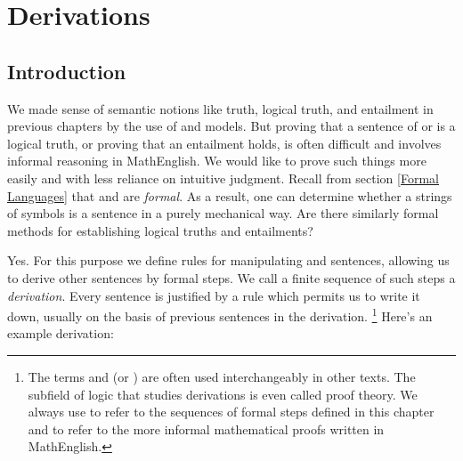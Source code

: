 
\chapter{Derivations}\label{Derivations}

\section{Introduction}\label{Derivation Preliminaries}


We made sense of semantic notions like truth, logical truth, and entailment in previous chapters by the use of \GSL{} and \GQL{} models.
But proving that a sentence of \GSL{} or \GQL{} is a logical truth, or proving that an entailment holds, is often difficult and involves informal reasoning in MathEnglish. 
We would like to prove such things more easily and with less reliance on intuitive judgment. 
Recall from section \ref{Formal Languages} that \GSL{} and \GQL{} are \emph{formal}.
As a result, one can determine whether a strings of symbols is a sentence in a purely mechanical way.
Are there similarly formal methods for establishing logical truths and entailments?

Yes.
For this purpose we define rules for manipulating \GSL{} and \GQL{} sentences, allowing us to derive other sentences by formal steps.
We call a finite sequence of such steps a \emph{derivation}. 
Every sentence is justified by a rule which permits us to write it down, usually on the basis of previous sentences in the derivation.%
\footnote{%
The terms  and  (or ) are often used interchangeably in other texts. 
The subfield of logic that studies derivations is even called proof theory.
We always use  to refer to the sequences of formal steps defined in this chapter and  to refer to the more informal mathematical proofs written in MathEnglish.
} Here's an example derivation:

\begin{gproofnn}
\end{gproofnn}

